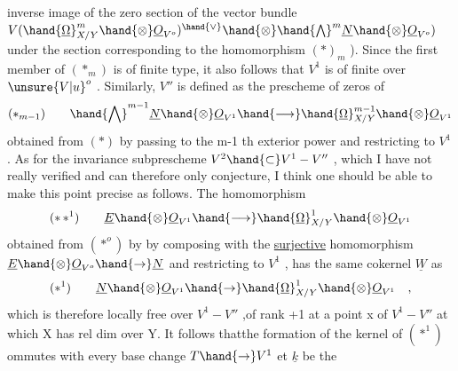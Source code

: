 
inverse image of the zero section of the vector bundle $V(\hand{\underline{\Omega}}^m_{X/Y}\hand{\otimes}\underline{O}_{V^o})^{\hand{\vee}}\hand{\otimes}\hand{\bigwedge}^m\underline{N}\hand{\otimes}\underline{O}_{V^o})$
under the section corresponding to the homomorphism $(*)_{m}$ ). Since the first member
of $(*_m)$ is of finite type, it also follows that $V^1$ is of finite 
over $\unsure{V|u}^o$ . Similarly, $V''$ is defined as the prescheme of zeros of
\[ (*_{m-1}) \qquad \hand{\bigwedge}^{m-1}\underline{N}\hand{\otimes}\underline{O}_{V^1} \hand{\longrightarrow} \hand{\underline{\Omega}}^{m-1}_{X/Y}\hand{\otimes}\underline{O}_{V^1} \]
obtained from $(*)$ by passing to the m-1 th exterior power and restricting to
$V^1$ . As for the invariance  subprescheme $V^2\hand{\subset} V^1-V''$ , which I have not really
verified and can therefore only conjecture, I think one should be able
to make this point precise as follows. The homomorphism
\[ (*\,*^1) \qquad \underline{E}\hand{\otimes}\underline{O}_{V^1}\hand{\longrightarrow}\hand{\underline{\Omega}}^1_{X/Y}\hand{\otimes}\underline{O}_{V^1} \]
obtained from $(*^o)$ by  by composing with the
\uline{surjective} homomorphism $\underline{E}\hand{\otimes}\underline{O}_{V^o}\hand{\to}\underline{N}$ and  restricting to $V^1$ , has the same cokernel
$\underline{W}$ as
\[ (*^1) \qquad \underline{N}\hand{\otimes}\underline{O}_{V^1}\hand{\to}\hand{\underline{\Omega}}^1_{X/Y}\hand{\otimes}\underline{O}_{V^1} \quad , \]
which  is therefore locally free over $V^1-V''$ ,\hand{(}of rank +1 at a point
x of $V^1-V''$ at which X has rel dim  over Y\hand{)}. It follows thatthe formation
of the kernel of $(*^1)$ ommutes with every base change $T\hand{\to} V^1$ et $\underline{k}$ be the
